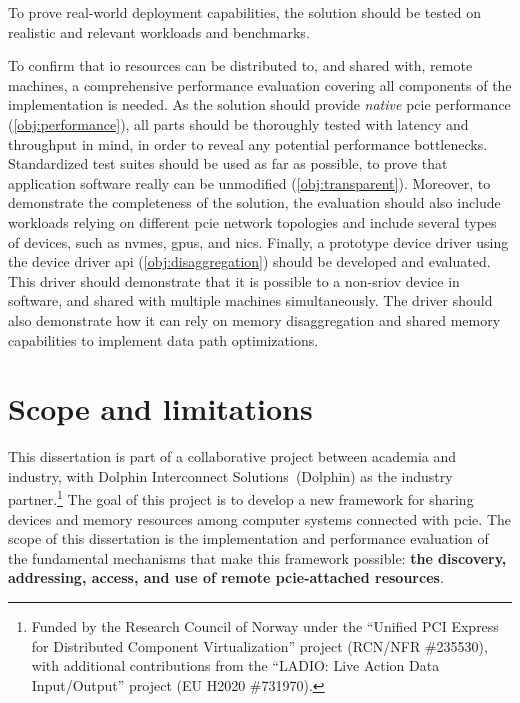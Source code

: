\begin{objective}\label{obj:experiments}
    To prove real-world deployment capabilities, the solution should be tested on realistic and relevant workloads and benchmarks.
\end{objective}
To confirm that \gls{io} resources can be distributed to, and shared with, remote machines, a comprehensive performance evaluation covering all components of the implementation is needed.
As the solution should provide \emph{native} \gls{pcie} performance (\cref{obj:performance}), all parts should be thoroughly tested with latency and throughput in mind, in order to reveal any potential performance bottlenecks.
Standardized test suites should be used as far as possible, to prove that application software really can be unmodified (\cref{obj:transparent}).
%
Moreover, to demonstrate the completeness of the solution, the evaluation should also include workloads relying on different \gls{pcie} network topologies and include several types of devices, such as \glspl{nvme}, \glspl{gpu}, and \glspl{nic}.
%
Finally, a prototype device driver using the device driver \gls{api} (\cref{obj:disaggregation}) should be developed and evaluated. This driver should demonstrate that it is possible to  a non-\gls{sriov} device in software, and shared with multiple machines simultaneously. 
%
The driver should also demonstrate how it can rely on memory \gls{disaggregation} and shared memory capabilities to implement data path optimizations.



\section{Scope and limitations}\label{sec:scope}
This dissertation is part of a collaborative project between academia and industry, with Dolphin Interconnect Solutions~(Dolphin) as the industry partner.\footnote{Funded by the Research Council of Norway under the ``Unified PCI Express for Distributed Component Virtualization'' project (RCN/NFR \#235530), with additional contributions from the ``LADIO: Live Action Data Input/Output'' project (EU H2020 \#731970).}
%
The goal of this project is to develop a new framework for sharing devices and memory resources among computer systems connected with \gls{pcie}.
%
The scope of this dissertation is the implementation and performance evaluation of the fundamental mechanisms that make this framework possible: \textbf{the discovery, addressing, access, and use of remote \gls{pcie}-attached resources}.



